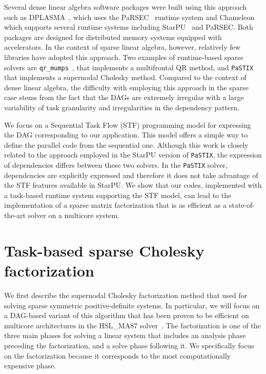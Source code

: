 \documentclass{article}
\newcommand{\starpu}{{StarPU}\xspace}
\newcommand{\parsec}{{PaRSEC}\xspace}
\newcommand{\ma}{HSL\_MA87\xspace}
\newcommand{\qrm}{\texttt{qr\_mumps}\xspace}
\newcommand{\pastix}{\texttt{PaSTIX}\xspace}
\newcommand{\lsection}[1]{\section{#1} \setcounter{equation}{0} \setcounter{figure}{0} \setcounter{table}{0} \label{#1}}
\begin{document}
Several dense linear algebra software packages were built using this
approach such as DPLASMA~\cite{b.b.d.f.ea:11}, which uses the
\parsec~\cite{b.b.d.f.ea:13} runtime system and Chameleon which
supports several runtime systems including \starpu~\cite{a.t.n.w:11}
and \parsec. Both packages are designed for distributed memory systems
equipped with accelerators. In the context of sparse linear algebra,
however, relatively few libraries have adopted this approach. Two
examples of runtime-based sparse solvers are \qrm~\cite{a.b.g.l.:14},
that implements a multifrontal QR method, and \pastix~\cite{h.r.r:02}
that implements a supernodal Cholesky method. Compared to the context
of dense linear algebra, the difficulty with employing this approach
in the sparse case stems from the fact that the DAGs are extremely
irregular with a large variability of task granularity and
irregularities in the dependency pattern.

We focus on a Sequential Task Flow (STF) programming model for
expressing the DAG corresponding to our application. This model
offers a simple way to define the parallel code from
the sequential one. Although this work is closely related to the
approach employed in the \starpu version of \pastix, the expression of
dependencies differs between these two solvers. In the \pastix solver,
dependencies are explicitly expressed and therefore it does not take
advantage of the STF features available in \starpu. We show that our
codes, implemented with a task-based runtime system supporting the STF
model, can lead to the implementation of a sparse matrix factorization
that is as efficient as a state-of-the-art solver on a multicore
system.



\lsection{Task-based sparse Cholesky factorization}\label{sec:chol}
\setcounter{equation}{0}
\setcounter{table}{0}
\setcounter{figure}{0}

We first describe the supernodal Cholesky factorization method that
used for solving sparse symmetric positive-definite systems. In
particular, we will focus on a DAG-based variant of this algorithm that
has been proven to be efficient on multicore architectures
in the \ma solver~\cite{h.r.s:10}. The factorization
is one of the three main phases for solving a linear system that
includes an analysis phase preceding the factorization, and a solve
phase following it. We specifically focus on the factorization because
it corresponds to the most computationally expensive phase.
\end{document}
